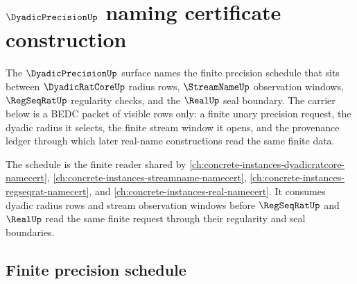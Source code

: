 \chapter{$\DyadicPrecisionUp$ naming certificate construction}
\label{ch:concrete-instances-dyadicprecision-namecert}

The $\DyadicPrecisionUp$ surface names the finite precision schedule that sits between $\DyadicRatCoreUp$ radius rows, $\StreamNameUp$ observation windows, $\RegSeqRatUp$ regularity checks, and the $\RealUp$ seal boundary. The carrier below is a BEDC packet of visible rows only: a finite unary precision request, the dyadic radius it selects, the finite stream window it opens, and the provenance ledger through which later real-name constructions read the same finite data.

The schedule is the finite reader shared by \autoref{ch:concrete-instances-dyadicratcore-namecert}, \autoref{ch:concrete-instances-streamname-namecert}, \autoref{ch:concrete-instances-regseqrat-namecert}, and \autoref{ch:concrete-instances-real-namecert}. It consumes dyadic radius rows and stream observation windows before $\RegSeqRatUp$ and $\RealUp$ read the same finite request through their regularity and seal boundaries.

\section{Finite precision schedule}
\label{sec:dyadicprecision-finite-schedule}

